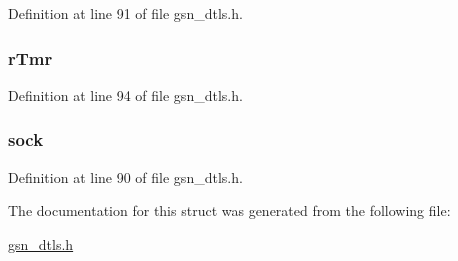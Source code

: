Definition at line 91 of file gsn\_\-dtls.h.

\hypertarget{a00057_ad1e735b99973e01e9258bf0e63853eef}{
\subsubsection[{rTmr}]{ {\bf rTmr}}}
\label{a00057_ad1e735b99973e01e9258bf0e63853eef}


Definition at line 94 of file gsn\_\-dtls.h.

\hypertarget{a00057_aba934750a9022e667e0fa36720a8ff26}{
\subsubsection[{sock}]{ {\bf sock}}}
\label{a00057_aba934750a9022e667e0fa36720a8ff26}


Definition at line 90 of file gsn\_\-dtls.h.



The documentation for this struct was generated from the following file:\begin{DoxyCompactItemize}
\item 
\hyperlink{a00487}{gsn\_\-dtls.h}\end{DoxyCompactItemize}
